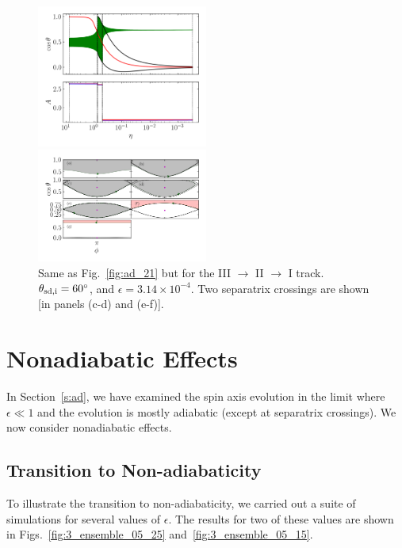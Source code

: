 \documentclass[
        fleqn,
        usenatbib,
    ]{mnras}
\begin{document}
\begin{figure}
    \centering
    \includegraphics[width=0.5\textwidth]{plots_diskdisp/3testo321.png}

    \includegraphics[width=0.5\textwidth]{plots_diskdisp/3testo321_subplots.png}
    \caption{Same as Fig.~\ref{fig:ad_21} but for the III $\to$ II $\to$ I
    track. $\theta_{\rm sd, i} = 60^\circ$, and $\epsilon = 3.14 \times
    10^{-4}$. Two separatrix crossings are shown [in panels (c-d) and (e-f)].
    }\label{fig:ad_321}
\end{figure}

\section{Nonadiabatic Effects}\label{s:nonad}

In Section~\ref{s:ad}, we have examined the spin axis evolution in the limit
where $\epsilon \ll 1$ and the evolution is mostly adiabatic (except at
separatrix crossings). We now consider nonadiabatic effects.

\subsection{Transition to Non-adiabaticity}\label{ss:transition}

To illustrate the transition to non-adiabaticity, we carried out a suite of
simulations for several values of $\epsilon$. The results for two of these
values are shown in Figs.~\ref{fig:3_ensemble_05_25}
and~\ref{fig:3_ensemble_05_15}.
\end{document}
